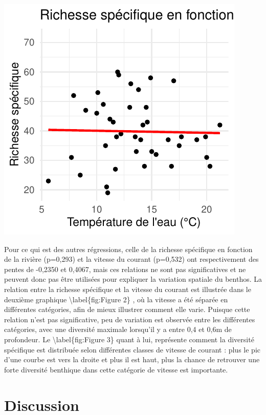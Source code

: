 \documentclass[9pt,twocolumn,twoside,]{pnas-new}
\begin{document}
\begin{center}\includegraphics{RMarkdown-article_files/figure-latex/unnamed-chunk-1-1} \end{center}

Pour ce qui est des autres régressions, celle de la richesse spécifique
en fonction de la rivière (p=0,293) et la vitesse du courant (p=0,532)
ont respectivement des pentes de -0,2350 et 0,4067, mais ces relations
ne sont pas significatives et ne peuvent donc pas être utilisées pour
expliquer la variation spatiale du benthos. La relation entre la
richesse spécifique et la vitesse du courant est illustrée dans le
deuxième graphique \textbackslash label\{fig:Figure 2\} , où la vitesse
a été séparée en différentes catégories, afin de mieux illustrer comment
elle varie. Puisque cette relation n'est pas significative, peu de
variation est observée entre les différentes catégories, avec une
diversité maximale lorsqu'il y a entre 0,4 et 0,6m de profondeur. Le
\textbackslash label\{fig:Figure 3\} quant à lui, représente comment la
diversité spécifique est distribuée selon différentes classes de vitesse
de courant : plus le pic d'une courbe est vers la droite et plus il est
haut, plus la chance de retrouver une forte diversité benthique dans
cette catégorie de vitesse est importante.

\section{Discussion}\label{discussion}
\end{document}
